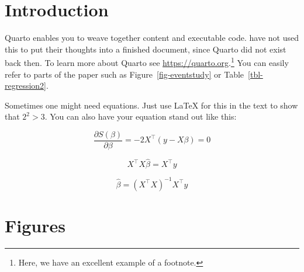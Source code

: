 \documentclass[12pt,a4paper,oneside]{article} %
\begin{document}
\clearpage
\setcounter{page}{1}
\clearpage
\newpage{}

\hypertarget{introduction}{%
\section{Introduction}\label{introduction}}

Quarto enables you to weave together content and executable code.
\textcite{abadieSemiparametric2005} have not used this to put their
thoughts into a finished document, since Quarto did not exist back then.
To learn more about Quarto see \url{https://quarto.org}.\footnote{Here,
  we have an excellent example of a footnote.} You can easily refer to
parts of the paper such as Figure~\ref{fig-eventstudy} or
Table~\ref{tbl-regression2}.

Sometimes one might need equations. Just use LaTeX for this in the text
to show that \(2^{2} > 3\). You can also have your equation stand out
like this:

\begin{equation}
\frac{\partial S(\beta)}{\partial \beta} = -2X^\top (y - X\beta) = 0
\end{equation}

\begin{equation}
X^\top X \hat{\beta} = X^\top y
\end{equation}

\begin{equation}
\hat{\beta} = (X^\top X)^{-1} X^\top y
\end{equation}

\lipsum[2-4]
\clearpage

\hypertarget{figures}{%
\section{Figures}\label{figures}}
\end{document}
